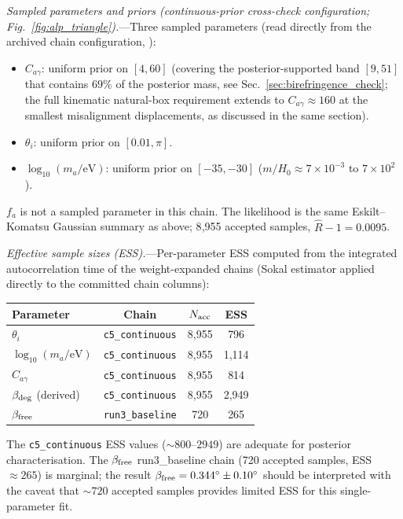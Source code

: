 \documentclass[aps,prd,twocolumn,superscriptaddress,showpacs,preprintnumbers,nofootinbib,longbibliography,floatfix]{revtex4-2}
\begin{document}
\textit{Sampled parameters and priors (continuous-prior cross-check
configuration; Fig.~\ref{fig:alp_triangle}).}---Three sampled parameters
(read directly from the archived chain configuration,
):
\begin{itemize}[leftmargin=*]
\item $C_{a\gamma}$: uniform prior on $[4, 60]$ (covering the
posterior-supported band $[9, 51]$ that contains $69\%$ of the
posterior mass, see Sec.~\ref{sec:birefringence_check}; the full
kinematic natural-box requirement extends to $C_{a\gamma}\approx 160$
at the smallest misalignment displacements, as discussed in the same
section).
\item $\theta_i$: uniform prior on $[0.01, \pi]$.
\item $\log_{10}(m_a/\text{eV})$: uniform prior on $[-35, -30]$
($m/H_0 \approx 7\times 10^{-3}$ to $7\times 10^{2}$).
\end{itemize}
$f_a$ is not a sampled parameter in this chain. The likelihood is the same
Eskilt--Komatsu Gaussian summary as above; 8{,}955 accepted samples,
$\hat R - 1 = 0.0095$.

\textit{Effective sample sizes (ESS).}---Per-parameter ESS computed from
the integrated autocorrelation time of the weight-expanded chains
(Sokal estimator applied directly to the committed chain columns):
\begin{center}
\begin{tabular}{lccc}
\hline
Parameter & Chain & $N_{\rm acc}$ & ESS \\
\hline
$\theta_i$ & \texttt{c5\_continuous} & 8{,}955 & 796 \\
$\log_{10}(m_a/\text{eV})$ & \texttt{c5\_continuous} & 8{,}955 & 1{,}114 \\
$C_{a\gamma}$ & \texttt{c5\_continuous} & 8{,}955 & 814 \\
$\beta_{\rm deg}$ (derived) & \texttt{c5\_continuous} & 8{,}955 & 2{,}949 \\
$\beta_{\rm free}$ & \texttt{run3\_baseline} & 720 & 265 \\
\hline
\end{tabular}
\end{center}
The \texttt{c5\_continuous} ESS values (${\sim}800$--$2949$) are adequate for
posterior characterisation. The $\beta_{\rm free}$ run3\_baseline chain
(720 accepted samples, ESS$\approx 265$) is marginal; the result
$\beta_{\rm free}=0.344^\circ\pm 0.10^\circ$ should be interpreted with
the caveat that ${\sim}720$ accepted samples provides limited ESS for
this single-parameter fit.
\end{document}
